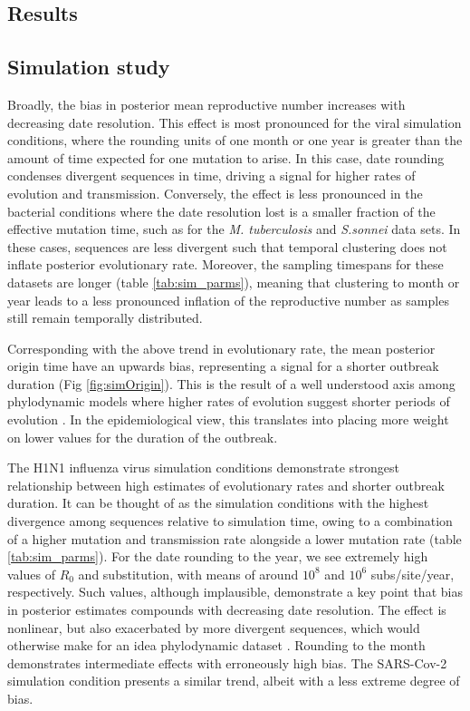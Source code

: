 \documentclass{article}
\begin{document}
\begin{spacing}{1.5}
\section*{Results}
\subsection*{Simulation study}
Broadly, the bias in posterior mean reproductive number increases with decreasing date resolution. This effect is most pronounced for the viral simulation conditions, where the rounding units of one month or one year is greater than the amount of time expected for one mutation to arise. In this case, date rounding condenses divergent sequences in time, driving a signal for higher rates of evolution and transmission. Conversely, the effect is less pronounced in the bacterial conditions where the date resolution lost is a smaller fraction of the effective mutation time, such as for the \textit{M. tuberculosis} and \textit{S.sonnei} data sets. In these cases, sequences are less divergent such that temporal clustering does not inflate posterior evolutionary rate. Moreover, the sampling timespans for these datasets are longer (table \ref{tab:sim_parms}), meaning that clustering to month or year leads to a less pronounced inflation of the reproductive number as samples still remain temporally distributed.

Corresponding with the above trend in evolutionary rate, the mean posterior origin time have an  upwards bias, representing a signal for a shorter outbreak duration (Fig \ref{fig:simOrigin}). This is the result of a well understood axis among phylodynamic models where higher rates of evolution suggest shorter periods of evolution \citep{featherstone_decoding_2023}. In the epidemiological view, this translates into placing more weight on lower values for the duration of the outbreak.

The H1N1 influenza virus simulation conditions demonstrate strongest relationship between high estimates of evolutionary rates and shorter outbreak duration. It can be thought of as the simulation conditions with the highest divergence among sequences relative to simulation time, owing to a combination of a higher mutation and transmission rate alongside a lower mutation rate (table \ref{tab:sim_parms}). For the date rounding to the year, we see extremely high values of $R_0$ and substitution, with means of around $10^{8}$ and $10^{6}$ subs/site/year, respectively. Such values, although implausible, demonstrate a key point that bias in posterior estimates compounds with decreasing date resolution. The effect is nonlinear, but also exacerbated by more divergent sequences, which would otherwise make for an idea phylodynamic dataset \citep{featherstone_decoding_2023}. Rounding to the month demonstrates intermediate effects with erroneously high bias. The SARS-Cov-2 simulation condition presents a similar trend, albeit with a less extreme degree of bias. 


\end{spacing}
\end{document}
